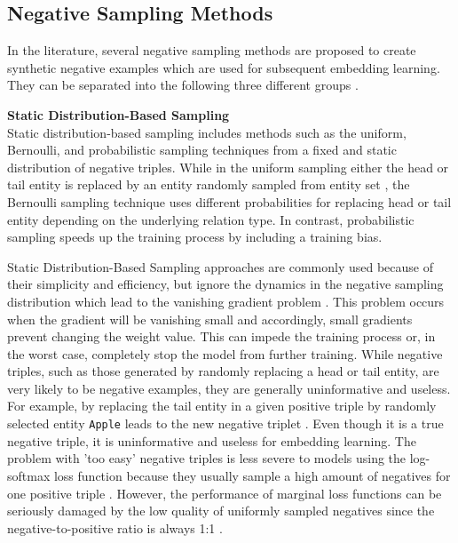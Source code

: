 \subsection{Negative Sampling Methods} 
\label{subsec:negative_sampling_methods}
%
In the literature, several negative sampling methods are proposed to create synthetic negative examples which are used for subsequent embedding learning.
They can be separated into the following three different groups \cite{qianunderstanding}.

\textbf{Static Distribution-Based Sampling} \label{static_distribution_based_sampling}\\
Static distribution-based sampling includes methods such as the uniform, Bernoulli, and probabilistic sampling techniques from a fixed and static distribution of negative triples.
While in the uniform sampling either the head or tail entity is replaced by an entity randomly sampled from entity set \entities,
the Bernoulli sampling technique uses different probabilities for replacing head or tail entity depending on the underlying relation type.
In contrast, probabilistic sampling speeds up the training process by including a training bias.
	
Static Distribution-Based Sampling approaches are commonly used because of their simplicity and efficiency, but ignore the dynamics in the negative sampling distribution which lead to the vanishing gradient problem \cite{qianunderstanding}.
This problem occurs when the gradient will be vanishing small and accordingly, small gradients prevent changing the weight value.
This can impede the training process or, in the worst case, completely stop the model from further training.
While negative triples, such as those generated by randomly replacing a head or tail entity, are very likely to be negative examples, they are generally uninformative and useless.
For example, by replacing the tail entity in a given positive triple by randomly selected entity \texttt{Apple} leads to the new negative triplet .
Even though it is a true negative triple, it is uninformative and useless for embedding learning.
The problem with 'too easy' negative triples is less severe to models using the log-softmax loss function because they usually sample a high amount of negatives for one positive triple \cite{cai2017kbgan}.
However, the performance of marginal loss functions can be seriously damaged by the low quality of uniformly sampled negatives since the negative-to-positive ratio is always 1:1 \cite{cai2017kbgan}.


